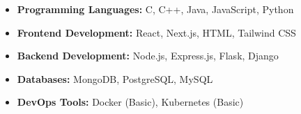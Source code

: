 
{\small
\begin{itemize}
  \item \textbf{Programming Languages:} C, C++, Java, JavaScript, Python
  \item \textbf{Frontend Development:} React, Next.js, HTML, Tailwind CSS
  \item \textbf{Backend Development:} Node.js, Express.js, Flask, Django
  \item \textbf{Databases:} MongoDB, PostgreSQL, MySQL
  \item \textbf{DevOps Tools:} Docker (Basic), Kubernetes (Basic)
\end{itemize}
}
